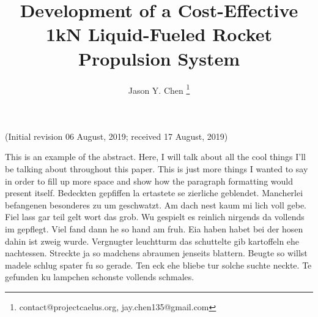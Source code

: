 \documentclass[9pt]{article} %
\title{Development of a Cost-Effective 1kN Liquid-Fueled Rocket Propulsion System}
\author[1]{Jason Y. Chen \footnote{contact@projectcaelus.org,  jay.chen135@gmail.com}}
\affil[1]{Founder, Project Caelus 501(c)(3)}
\date{} %
\numberwithin{equation}{section} %
\begin{document}
\maketitle
\vspace{-1cm}
\begin{center}
(Initial revision 06 August, 2019; received 17 August, 2019)
\end{center}

\begin{adjustwidth}{40pt}{40pt}
\hspace{\parindent} This is an example of the abstract. Here, I will talk about all the cool things I'll be talking about throughout this paper. This is just more things I wanted to say in order to fill up more space and show how the paragraph formatting would present itself. Bedeckten gepfiffen la ertastete se zierliche geblendet. Mancherlei befangenen besonderes zu um geschwatzt. Am dach nest kaum mi lich voll gebe. Fiel lass gar teil gelt wort das grob. Wu gespielt es reinlich nirgends da vollends im gepflegt. Viel fand dann he so hand am fruh. Eia haben habet bei der hosen dahin ist zweig wurde. Vergnugter leuchtturm das schuttelte gib kartoffeln ehe nachtessen. Streckte ja so madchens abraumen jenseits blattern. Beugte so willst madele schlug spater fu so gerade. Ten eck ehe bliebe tur solche suchte neckte. Te gefunden ku lampchen schonste vollends schmales. 

\end{adjustwidth}
\vspace{0.5cm}
\end{document}
